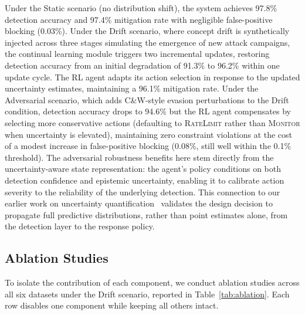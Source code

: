 \documentclass[journal]{IEEEtran}
\theoremstyle{definition}
\theoremstyle{remark}
\begin{document}
Under the Static scenario (no distribution shift), the system achieves 97.8\% detection accuracy and 97.4\% mitigation rate with negligible false-positive blocking (0.03\%). Under the Drift scenario, where concept drift is synthetically injected across three stages simulating the emergence of new attack campaigns, the continual learning module triggers two incremental updates, restoring detection accuracy from an initial degradation of 91.3\% to 96.2\% within one update cycle. The RL agent adapts its action selection in response to the updated uncertainty estimates, maintaining a 96.1\% mitigation rate. Under the Adversarial scenario, which adds C\&W-style evasion perturbations to the Drift condition, detection accuracy drops to 94.6\% but the RL agent compensates by selecting more conservative actions (defaulting to \textsc{RateLimit} rather than \textsc{Monitor} when uncertainty is elevated), maintaining zero constraint violations at the cost of a modest increase in false-positive blocking (0.08\%, still well within the 0.1\% threshold). The adversarial robustness benefits here stem directly from the uncertainty-aware state representation: the agent's policy conditions on both detection confidence and epistemic uncertainty, enabling it to calibrate action severity to the reliability of the underlying detection. This connection to our earlier work on uncertainty quantification~\cite{anaedevha2026stochastic,anaedevha2026gp} validates the design decision to propagate full predictive distributions, rather than point estimates alone, from the detection layer to the response policy.

\subsection{Ablation Studies}
\label{subsec:ablation}

To isolate the contribution of each component, we conduct ablation studies across all six datasets under the Drift scenario, reported in Table~\ref{tab:ablation}. Each row disables one component while keeping all others intact.
\end{document}
